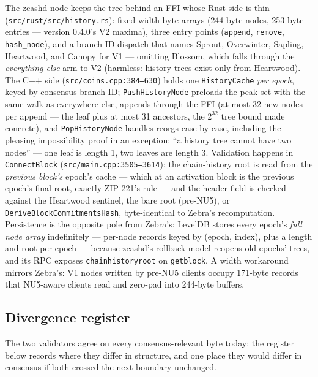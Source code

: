 \documentclass[11pt,a4paper]{article}
\theoremstyle{definition}
\begin{document}
The zcashd node keeps the tree behind an FFI whose Rust side is thin
(\texttt{src/rust/\allowbreak src/history.rs}): fixed-width byte arrays
(244-byte
nodes, 253-byte entries --- version 0.4.0's V2 maxima), three entry
points (\texttt{append}, \texttt{remove}, \texttt{hash\_node}), and a
branch-ID dispatch that names Sprout, Overwinter, Sapling, Heartwood, and
Canopy for V1 --- omitting Blossom, which falls through the
\emph{everything else} arm to V2 (harmless: history trees exist only from
Heartwood). The C++ side
(\texttt{src/coins.cpp:384--630}) holds one \texttt{HistoryCache}
\emph{per epoch}, keyed by consensus branch ID;
\texttt{PushHistory\allowbreak Node} preloads the peak set with the same
walk as everywhere else, appends
through the FFI (at most 32 new nodes per append --- the leaf plus at most
31 ancestors, the $2^{32}$ tree bound made concrete), and
\texttt{PopHistoryNode} handles reorgs case by case,
including the pleasing impossibility proof in an exception: ``a history
tree cannot have two nodes'' --- one leaf is length 1, two leaves are
length 3. Validation happens in \texttt{ConnectBlock}
(\texttt{src/main.cpp:3505--3614}): the chain-history root is read from
the \emph{previous block's} epoch's cache --- which at an activation
block is the previous epoch's final root, exactly ZIP-221's rule ---
and the header field is checked against the Heartwood sentinel, the bare
root (pre-NU5), or \texttt{DeriveBlock\allowbreak CommitmentsHash},
byte-identical to Zebra's recomputation. Persistence is the opposite pole from
Zebra's: LevelDB stores every epoch's \emph{full node array}
indefinitely --- per-node records keyed by (epoch, index), plus a
length and root per epoch --- because zcashd's rollback model reopens
old epochs' trees, and its RPC exposes
\texttt{chainhistoryroot} on \texttt{getblock}. A width workaround
mirrors Zebra's: V1 nodes written by pre-NU5 clients occupy 171-byte
records that NU5-aware clients read and zero-pad into 244-byte buffers.

\subsection{Divergence register}\label{sec:fc-divergences}

The two validators agree on every consensus-relevant byte today; the
register below records where they differ in structure, and one place
they would differ in consensus if both crossed the next boundary
unchanged.
\end{document}

